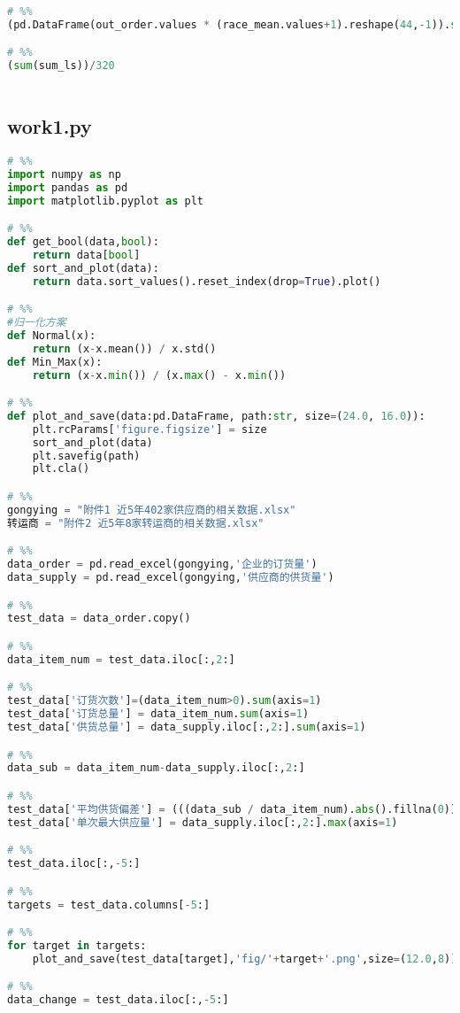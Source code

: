 \begin{appendices}
\begin{lstlisting}[language=python]
# %%
(pd.DataFrame(out_order.values * (race_mean.values+1).reshape(44,-1)).sum().sum())/24

# %%
(sum(sum_ls))/320



\end{lstlisting}

\subsection{work1.py}

\begin{lstlisting}[language=python]
# %%
import numpy as np
import pandas as pd
import matplotlib.pyplot as plt

# %%
def get_bool(data,bool):
    return data[bool]
def sort_and_plot(data):
    return data.sort_values().reset_index(drop=True).plot()

# %%
#归一化方案
def Normal(x):
    return (x-x.mean()) / x.std()
def Min_Max(x):
    return (x-x.min()) / (x.max() - x.min())

# %%
def plot_and_save(data:pd.DataFrame, path:str, size=(24.0, 16.0)):
    plt.rcParams['figure.figsize'] = size
    sort_and_plot(data)
    plt.savefig(path)
    plt.cla()

# %%
gongying = "附件1 近5年402家供应商的相关数据.xlsx"
转运商 = "附件2 近5年8家转运商的相关数据.xlsx"

# %%
data_order = pd.read_excel(gongying,'企业的订货量')
data_supply = pd.read_excel(gongying,'供应商的供货量')

# %%
test_data = data_order.copy()

# %%
data_item_num = test_data.iloc[:,2:]

# %%
test_data['订货次数']=(data_item_num>0).sum(axis=1)
test_data['订货总量'] = data_item_num.sum(axis=1)
test_data['供货总量'] = data_supply.iloc[:,2:].sum(axis=1)

# %%
data_sub = data_item_num-data_supply.iloc[:,2:]

# %%
test_data['平均供货偏差'] = (((data_sub / data_item_num).abs().fillna(0)).sum(axis=1) / test_data['订货次数'])
test_data['单次最大供应量'] = data_supply.iloc[:,2:].max(axis=1)

# %%
test_data.iloc[:,-5:]

# %%
targets = test_data.columns[-5:]

# %%
for target in targets:
    plot_and_save(test_data[target],'fig/'+target+'.png',size=(12.0,8))

# %%
data_change = test_data.iloc[:,-5:]


\end{lstlisting}
\end{appendices}
